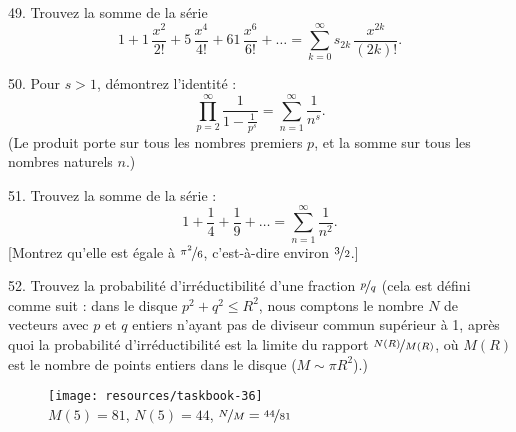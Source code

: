 \begin{problem}{49.}
    Trouvez la somme de la série
    \begin{equation*}
        1+1\, \frac{x^2}{2!}+5\, \frac{x^4}{4!}+61\, \frac{x^6}{6!}+\dots=
        \textstyle\sum\limits_{k=0}^{\infty} s_{2k}\,\frac{x^{2k}}{(2k)!}.
    \end{equation*}
\end{problem}

\begin{problem}{50.}
    Pour \( s>1 \), démontrez l'identité :
    \begin{equation*}
        \textstyle\prod\limits_{p=2}^{\infty} \frac{1}{1-\frac{1}{p^s}}=\textstyle\sum\limits_{n=1}^{\infty} \frac{1}{n^s}.
    \end{equation*}
    (Le produit porte sur tous les nombres premiers \( p \), et la somme sur tous les nombres naturels \( n \).)
\end{problem}

\begin{problem}{51.}
    Trouvez la somme de la série :
    \begin{equation*}
        1+ \frac{1}{4}+ \frac{1}{9}+\dots=\textstyle\sum\limits_{n=1}^{\infty} \frac{1}{n^2}.
    \end{equation*}
    [Montrez qu'elle est égale à \(\nicefrac{\pi^2}{6}\), c'est-à-dire environ \(\nicefrac{3}{2}\).]
\end{problem}

\begin{problem}{52.}
    Trouvez la probabilité d'irréductibilité d'une fraction \(\nicefrac{p}{q}\) (cela est défini comme suit :
    dans le disque \( p^2+q^2 \leqslant R^2 \), nous comptons le nombre \( N \) de vecteurs avec \( p \) et \( q \) entiers
    n'ayant pas de diviseur commun supérieur à 1, après quoi la probabilité d'irréductibilité est la
    limite du rapport \(\nicefrac{N(R)}{M(R)}\), où \( M(R) \) est le nombre de points entiers dans le disque (\( M \sim \pi R^2 \)).)
    \begin{figure}
        \texttt{[image: resources/taskbook-36]}\\
        \footnotesize \( M(5)=81 \), \( N(5)=44 \), \(\nicefrac{N}{M} = \nicefrac{44}{81} \)
    \end{figure}
\end{problem}

